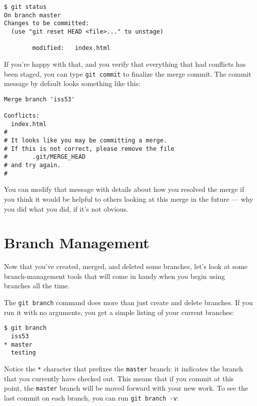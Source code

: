 \documentclass[a4paper]{book}
\begin{document}
\begin{shaded}\begin{verbatim}
$ git status
On branch master
Changes to be committed:
  (use "git reset HEAD <file>..." to unstage)

        modified:   index.html
\end{verbatim}\end{shaded}

If you're happy with that, and you verify that everything that had conflicts has been staged, you can type \texttt{git commit} to finalize the merge commit. The commit message by default looks something like this:

\begin{shaded}\begin{verbatim}
Merge branch 'iss53'

Conflicts:
  index.html
#
# It looks like you may be committing a merge.
# If this is not correct, please remove the file
#       .git/MERGE_HEAD
# and try again.
#
\end{verbatim}\end{shaded}

You can modify that message with details about how you resolved the merge if you think it would be helpful to others looking at this merge in the future --- why you did what you did, if it's not obvious.

\section{Branch Management}\label{branch-management}

Now that you've created, merged, and deleted some branches, let's look at some branch-management tools that will come in handy when you begin using branches all the time.

The \texttt{git branch} command does more than just create and delete branches. If you run it with no arguments, you get a simple listing of your current branches:

\begin{shaded}\begin{verbatim}
$ git branch
  iss53
* master
  testing
\end{verbatim}\end{shaded}

Notice the \texttt{*} character that prefixes the \texttt{master} branch: it indicates the branch that you currently have checked out. This means that if you commit at this point, the \texttt{master} branch will be moved forward with your new work. To see the last commit on each branch, you can run \texttt{git branch -v}:
\end{document}

